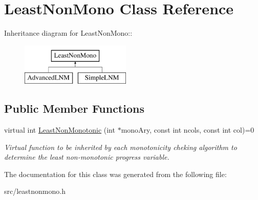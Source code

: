 \hypertarget{classLeastNonMono}{
\section{LeastNonMono Class Reference}
\label{d9/da9/classLeastNonMono}
}
Inheritance diagram for LeastNonMono::\begin{figure}[H]
\begin{center}
\leavevmode
\includegraphics[height=2cm]{d9/da9/classLeastNonMono}
\end{center}
\end{figure}
\subsection*{Public Member Functions}
\begin{DoxyCompactItemize}
\item 
\hypertarget{classLeastNonMono_a239cbd7836950dc7c758138c4db00d0c}{
virtual int \hyperlink{classLeastNonMono_a239cbd7836950dc7c758138c4db00d0c}{LeastNonMonotonic} (int $\ast$monoAry, const int ncols, const int col)=0}
\label{d9/da9/classLeastNonMono_a239cbd7836950dc7c758138c4db00d0c}

\begin{DoxyCompactList}\small\item\em Virtual function to be inherited by each monotonicity cheking algorithm to determine the least non-\/monotonic progress variable. \item\end{DoxyCompactList}\end{DoxyCompactItemize}


The documentation for this class was generated from the following file:\begin{DoxyCompactItemize}
\item 
src/leastnonmono.h\end{DoxyCompactItemize}
